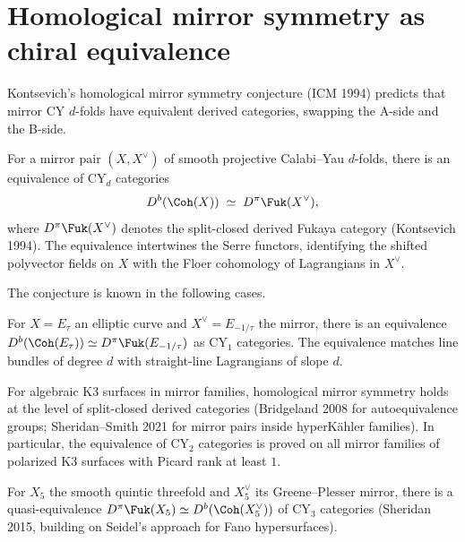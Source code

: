 \section{Homological mirror symmetry as chiral equivalence}
\label{sec:hms-chiral-derived}

Kontsevich's homological mirror symmetry conjecture (ICM 1994) predicts that mirror CY $d$-folds have equivalent derived categories, swapping the A-side and the B-side.

\begin{conjecture}
\label{conj:hms}
\ClaimStatusConjectured
For a mirror pair $(X, X^\vee)$ of smooth projective Calabi--Yau $d$-folds, there is an equivalence of CY$_d$ categories
\[
 D^b(\Coh(X)) \;\simeq\; D^\pi\Fuk(X^\vee),
\]
where $D^\pi\Fuk(X^\vee)$ denotes the split-closed derived Fukaya category (Kontsevich 1994). The equivalence intertwines the Serre functors, identifying the shifted polyvector fields on $X$ with the Floer cohomology of Lagrangians in $X^\vee$.
\end{conjecture}

The conjecture is known in the following cases.

\begin{theorem}
\label{thm:hms-d1}
For $X = E_\tau$ an elliptic curve and $X^\vee = E_{-1/\tau}$ the mirror, there is an equivalence $D^b(\Coh(E_\tau)) \simeq D^\pi\Fuk(E_{-1/\tau})$ as CY$_1$ categories. The equivalence matches line bundles of degree $d$ with straight-line Lagrangians of slope $d$.
\end{theorem}

\begin{theorem}
\label{thm:hms-d2}
For algebraic K3 surfaces in mirror families, homological mirror symmetry holds at the level of split-closed derived categories (Bridgeland 2008 for autoequivalence groups; Sheridan--Smith 2021 for mirror pairs inside hyperK\"ahler families). In particular, the equivalence of CY$_2$ categories is proved on all mirror families of polarized K3 surfaces with Picard rank at least $1$.
\end{theorem}

\begin{theorem}
\label{thm:hms-quintic}
For $X_5$ the smooth quintic threefold and $X_5^\vee$ its Greene--Plesser mirror, there is a quasi-equivalence $D^\pi\Fuk(X_5) \simeq D^b(\Coh(X_5^\vee))$ of CY$_3$ categories (Sheridan 2015, building on Seidel's approach for Fano hypersurfaces).
\end{theorem}

